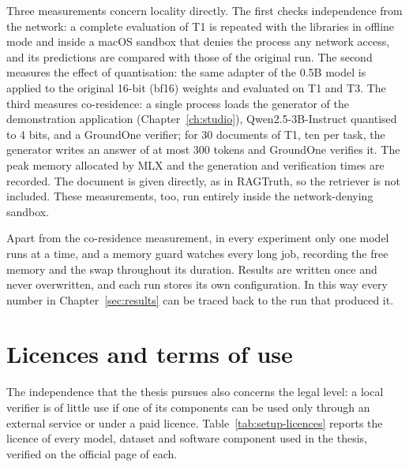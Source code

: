 Three measurements concern locality directly. The first checks independence from the network: a complete evaluation of
T1 is repeated with the libraries in offline mode and inside a macOS sandbox that denies the process any network access,
and its predictions are compared with those of the original run. The second measures the effect of quantisation: the
same adapter of the 0.5B model is applied to the original 16-bit (bf16) weights and evaluated on T1 and T3. The third
measures co-residence: a single process loads the generator of the demonstration application
(Chapter~\ref{ch:studio}), Qwen2.5-3B-Instruct quantised to 4 bits, and a GroundOne verifier; for 30 documents of T1, ten
per task, the generator writes an answer of at most 300 tokens and GroundOne verifies it. The peak memory allocated by
MLX and the generation and verification times are recorded. The document is given directly, as in RAGTruth, so the
retriever is not included. These measurements, too, run entirely inside the network-denying sandbox.

Apart from the co-residence measurement, in every experiment only one model runs at a time, and a memory guard watches every long job, recording the free memory
and the swap throughout its duration. Results are written once and never overwritten, and each run stores its own
configuration. In this way every number in Chapter~\ref{sec:results} can be traced back to the run that produced it.

\section{Licences and terms of use}
\label{sec:setup-licences}

The independence that the thesis pursues also concerns the legal level: a local verifier is of little use if one of its
components can be used only through an external service or under a paid licence. Table~\ref{tab:setup-licences} reports
the licence of every model, dataset and software component used in the thesis, verified on the official page of each.

